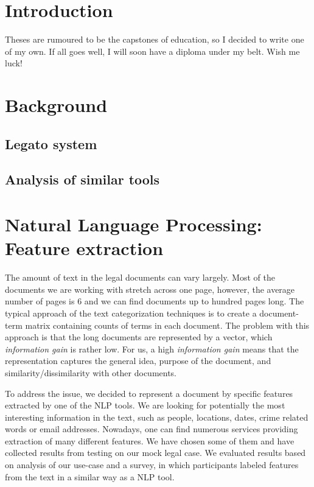 \documentclass[
  digital, %
  table,   %
  lof,     %
  lot,     %
]{fithesis3}
\begin{document}
\chapter*{Introduction}

Theses are rumoured to be the capstones of education, so I decided
to write one of my own. If all goes well, I will soon have a
diploma under my belt. Wish me luck!

\chapter{Background}
\section{Legato system}
\section{Analysis of similar tools}
\chapter{Natural Language Processing: Feature extraction}
The amount of text in the legal documents can vary largely.
Most of the documents we are working with stretch across one page, however, the average number of pages is 6 and we can find documents up to hundred pages long.
The typical approach of the text categorization techniques is to create a document-term matrix containing counts of terms in each document.
The problem with this approach is that the long documents are represented by a vector, which \emph{information gain} is rather low.
For us, a high \emph{information gain} means that the representation captures the general idea, purpose of the document, and similarity/dissimilarity with other documents.

To address the issue, we decided to represent a document by specific features extracted by one of the NLP tools.
We are looking for potentially the most interesting information in the text, such as people, locations, dates, crime related words or email addresses.
Nowadays, one can find numerous services providing extraction of many different features.
We have chosen some of them and have collected results from testing on our mock legal case.
We evaluated results based on analysis of our use-case and a survey, in which participants labeled features from the text in a similar way as a NLP tool.
\end{document}
